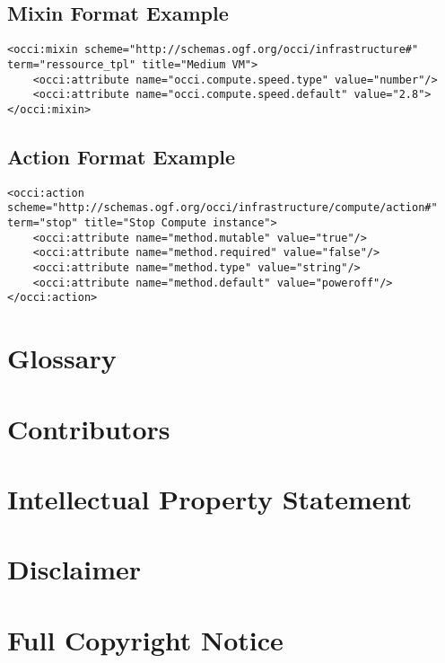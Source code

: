 \documentclass[10pt,a4paper]{article}
\begin{document}
\subsection{Mixin Format Example}
\label{sec:example_mixin}
\begin{lstlisting}
<occi:mixin scheme="http://schemas.ogf.org/occi/infrastructure#" term="ressource_tpl" title="Medium VM">
	<occi:attribute name="occi.compute.speed.type" value="number"/>
	<occi:attribute name="occi.compute.speed.default" value="2.8">		
</occi:mixin>
\end{lstlisting}

\subsection{Action Format Example}
\label{sec:example_action}
\begin{lstlisting}
<occi:action scheme="http://schemas.ogf.org/occi/infrastructure/compute/action#" term="stop" title="Stop Compute instance">
	<occi:attribute name="method.mutable" value="true"/>
	<occi:attribute name="method.required" value="false"/>
	<occi:attribute name="method.type" value="string"/>
	<occi:attribute name="method.default" value="poweroff"/>
</occi:action>
\end{lstlisting}

\section{Glossary}
\label{sec:glossary}


\section{Contributors}


\section{Intellectual Property Statement}


\section{Disclaimer}


\section{Full Copyright Notice}




\end{document}
